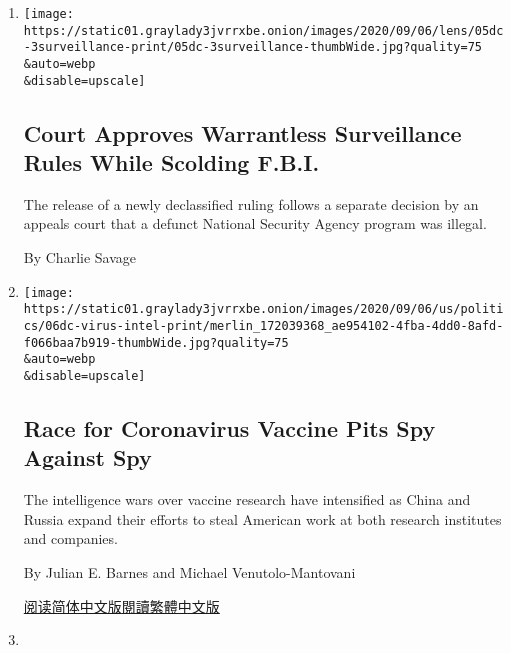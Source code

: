 \begin{enumerate}
\def\labelenumi{\arabic{enumi}.}
\item
  \href{/2020/09/05/us/politics/court-approves-warrantless-surveillance-rules-while-scolding-fbi.html}{}

  \texttt{[image: https://static01.graylady3jvrrxbe.onion/images/2020/09/06/lens/05dc-3surveillance-print/05dc-3surveillance-thumbWide.jpg?quality=75\\\&auto=webp\\\&disable=upscale]}

  \hypertarget{court-approves-warrantless-surveillance-rules-while-scolding-fbi}{%
  \subsection{Court Approves Warrantless Surveillance Rules While
  Scolding
  F.B.I.}\label{court-approves-warrantless-surveillance-rules-while-scolding-fbi}}

  The release of a newly declassified ruling follows a separate decision
  by an appeals court that a defunct National Security Agency program
  was illegal.

  By Charlie Savage
\item
  \href{/2020/09/05/us/politics/coronavirus-vaccine-espionage.html}{}

  \texttt{[image: https://static01.graylady3jvrrxbe.onion/images/2020/09/06/us/politics/06dc-virus-intel-print/merlin\_172039368\_ae954102-4fba-4dd0-8afd-f066baa7b919-thumbWide.jpg?quality=75\\\&auto=webp\\\&disable=upscale]}

  \hypertarget{race-for-coronavirus-vaccine-pits-spy-against-spy}{%
  \subsection{Race for Coronavirus Vaccine Pits Spy Against
  Spy}\label{race-for-coronavirus-vaccine-pits-spy-against-spy}}

  The intelligence wars over vaccine research have intensified as China
  and Russia expand their efforts to steal American work at both
  research institutes and companies.

  By Julian E. Barnes and Michael Venutolo-Mantovani

  \href{https://cn.nytimes3xbfgragh.onion/usa/20200907/coronavirus-vaccine-espionage/}{阅读简体中文版}\href{https://cn.nytimes3xbfgragh.onion/usa/20200907/coronavirus-vaccine-espionage/zh-hant/}{閱讀繁體中文版}
\item
  \href{/2020/09/02/us/elections/russians-are-again-targeting-americans-with-disinformation-facebook-and-twitter-warn.html}{}


\end{enumerate}
